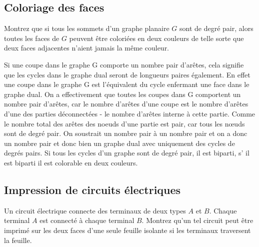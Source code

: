 \subsection{Coloriage des faces}
Montrez que si tous les sommets d’un graphe planaire $G$ sont de degré pair, alors toutes les faces de $G$ peuvent être coloriées en deux couleurs de telle sorte que deux faces adjacentes n’aient jamais la même couleur.

\begin{solution}
Si une coupe dans le graphe G comporte un nombre pair d'arêtes, cela signifie que les cycles dans le graphe dual seront de longueurs paires également. En effet une coupe dans le graphe G est l'équivalent du cycle enfermant une face dans le graphe dual. On a effectivement que toutes les coupes dans G comportent un nombre pair d'arêtes, car le nombre d'arêtes d'une coupe est le nombre d'arêtes d'une des parties déconnectées - le nombre d'arêtes interne à cette partie. Comme le nombre total des arêtes des noeuds d'une partie est pair, car tous les nœuds sont de degré pair. On soustrait un nombre pair à un nombre pair et on a donc un nombre pair et donc bien un graphe dual avec uniquement des cycles de degrés pairs. Si tous les cycles d'un graphe sont de degré pair, il est biparti, s’ il est biparti il est colorable en deux couleurs.

\end{solution}

\subsection{Impression de circuits électriques}
Un circuit électrique connecte des terminaux de deux types $A$ et $B$. Chaque terminal $A$ est connecté à chaque terminal $B$. Montrez qu’un tel circuit peut être imprimé sur les deux faces d’une seule feuille isolante si les terminaux traversent la feuille.

\begin{solution}
  \nosolution
\end{solution}
